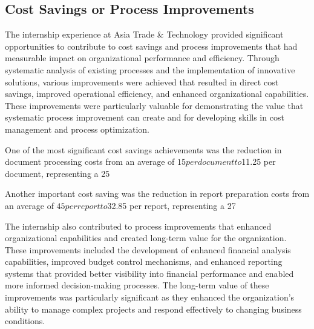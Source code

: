 \subsection{Cost Savings or Process Improvements}
The internship experience at Asia Trade \& Technology provided significant opportunities to contribute to cost savings and process improvements that had measurable impact on organizational performance and efficiency. Through systematic analysis of existing processes and the implementation of innovative solutions, various improvements were achieved that resulted in direct cost savings, improved operational efficiency, and enhanced organizational capabilities. These improvements were particularly valuable for demonstrating the value that systematic process improvement can create and for developing skills in cost management and process optimization.

One of the most significant cost savings achievements was the reduction in document processing costs from an average of $15 per document to $11.25 per document, representing a 25%

Another important cost saving was the reduction in report preparation costs from an average of $45 per report to $32.85 per report, representing a 27%

The internship also contributed to process improvements that enhanced organizational capabilities and created long-term value for the organization. These improvements included the development of enhanced financial analysis capabilities, improved budget control mechanisms, and enhanced reporting systems that provided better visibility into financial performance and enabled more informed decision-making processes. The long-term value of these improvements was particularly significant as they enhanced the organization's ability to manage complex projects and respond effectively to changing business conditions.

